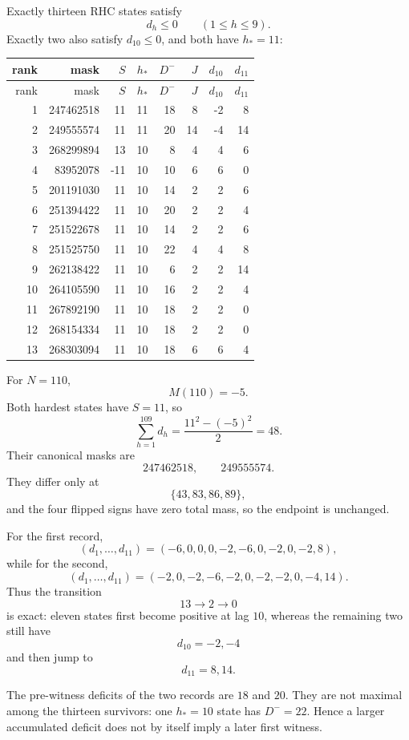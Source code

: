 \documentclass[11pt]{article}
\begin{document}
Exactly thirteen RHC states satisfy
\[
 d_h\le0\qquad(1\le h\le9).
\]
Exactly two also satisfy $d_{10}\le0$, and both have $h_*=11$:
\begin{center}\scriptsize
\begin{longtable}{r r r r r r r r}
\toprule rank & mask & $S$ & $h_*$ & $D^-$ & $J$ & $d_{10}$ & $d_{11}$\\
\midrule\endfirsthead
\toprule rank & mask & $S$ & $h_*$ & $D^-$ & $J$ & $d_{10}$ & $d_{11}$\\
\midrule\endhead
1 & 247462518 & 11 & 11 & 18 & 8 & -2 & 8\\
2 & 249555574 & 11 & 11 & 20 & 14 & -4 & 14\\
3 & 268299894 & 13 & 10 & 8 & 4 & 4 & 6\\
4 & 83952078 & -11 & 10 & 10 & 6 & 6 & 0\\
5 & 201191030 & 11 & 10 & 14 & 2 & 2 & 6\\
6 & 251394422 & 11 & 10 & 20 & 2 & 2 & 4\\
7 & 251522678 & 11 & 10 & 14 & 2 & 2 & 6\\
8 & 251525750 & 11 & 10 & 22 & 4 & 4 & 8\\
9 & 262138422 & 11 & 10 & 6 & 2 & 2 & 14\\
10 & 264105590 & 11 & 10 & 16 & 2 & 2 & 4\\
11 & 267892190 & 11 & 10 & 18 & 2 & 2 & 0\\
12 & 268154334 & 11 & 10 & 18 & 2 & 2 & 0\\
13 & 268303094 & 11 & 10 & 18 & 6 & 6 & 4\\
\bottomrule\end{longtable}
\end{center}

For $N=110$,
\[
 M(110)=-5.
\]
Both hardest states have $S=11$, so
\[
 \sum_{h=1}^{109}d_h
 =\frac{11^2-(-5)^2}{2}
 =48.
\]
Their canonical masks are
\[
 \boxed{247462518,\qquad249555574.}
\]
They differ only at
\[
 \boxed{\{43,83,86,89\}},
\]
and the four flipped signs have zero total mass, so the endpoint is unchanged.

For the first record,
\[
 (d_1,\ldots,d_{11})
 =(-6,0,0,0,-2,-6,0,-2,0,-2,8),
\]
while for the second,
\[
 (d_1,\ldots,d_{11})
 =(-2,0,-2,-6,-2,0,-2,-2,0,-4,14).
\]
Thus the transition
\[
 13\longrightarrow2\longrightarrow0
\]
is exact: eleven states first become positive at lag $10$, whereas the remaining two still have
\[
 d_{10}=-2,-4
\]
and then jump to
\[
 d_{11}=8,14.
\]

The pre-witness deficits of the two records are $18$ and $20$.  They are not maximal among the thirteen survivors: one $h_*=10$ state has $D^-=22$.  Hence a larger accumulated deficit does not by itself imply a later first witness.
\end{document}
